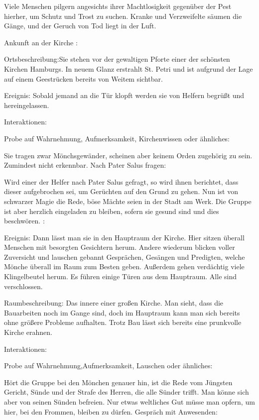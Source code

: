Viele Menschen pilgern angesichts ihrer Machtlosigkeit gegenüber der Pest hierher, um Schutz und Trost zu suchen. Kranke und Verzweifelte säumen die Gänge, und der Geruch von Tod liegt in der Luft.


Ankunft an der Kirche
:

Ortsbeschreibung:Sie stehen vor der gewaltigen Pforte einer der schönsten Kirchen Hamburgs. In neuem Glanz erstrahlt St. Petri und ist aufgrund der Lage auf einem Geestrücken bereits von Weitem sichtbar.

Ereignis: Sobald jemand an die Tür klopft werden sie von Helfern begrüßt und hereingelassen.

Interaktionen:

Probe auf Wahrnehmung, Aufmerksamkeit, Kirchenwissen oder ähnliches:

Sie tragen zwar Mönchsgewänder, scheinen aber keinem Orden zugehörig zu sein.
Zumindest nicht erkennbar.
Nach Pater Salus fragen:

Wird einer der Helfer nach Pater Salus gefragt, so wird ihnen berichtet, dass dieser aufgebrochen sei, um Gerüchten auf den Grund zu gehen.
Nun ist von schwarzer Magie die Rede, böse Mächte seien in der Stadt am Werk. Die Gruppe ist aber herzlich eingeladen zu bleiben, sofern sie gesund sind und dies beschwören.
:

Ereignis: Dann lässt man sie in den Hauptraum der Kirche. Hier sitzen überall Menschen mit besorgten Gesichtern herum. Andere wiederum blicken voller Zuversicht und lauschen gebannt Gesprächen, Gesängen und Predigten, welche Mönche überall im Raum zum Besten geben. Außerdem gehen verdächtig viele Klingelbeutel herum. Es führen einige Türen aus dem Hauptraum. Alle sind verschlossen.

Raumbeschreibung: Das innere einer großen Kirche. Man sieht, dass die Bauarbeiten noch im Gange sind, doch im Hauptraum kann man sich bereits ohne größere Probleme aufhalten. Trotz Bau lässt sich bereits eine prunkvolle Kirche erahnen.

Interaktionen:

Probe auf Wahrnehmung,Aufmerksamkeit, Lauschen oder ähnliches:

Hört die Gruppe bei den Mönchen genauer hin, ist die Rede vom Jüngsten Gericht,
Sünde und der Strafe des Herren, die alle Sünder trifft.
Man könne sich aber von seinen Sünden befreien.
Nur etwas weltliches Gut müsse man opfern, um hier,
bei den Frommen, bleiben zu dürfen.
Gespräch mit Anwesenden:

